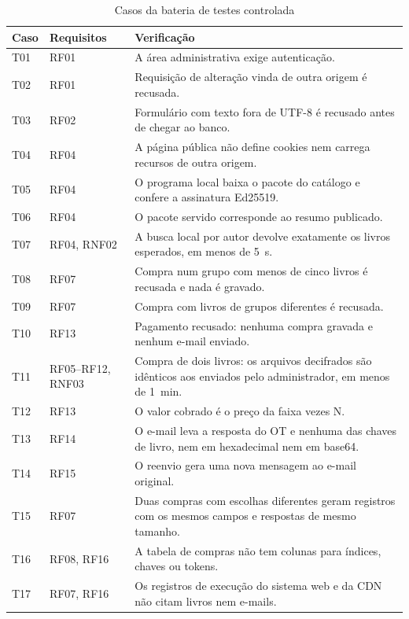 \begin{table}[H]
\centering
\caption{Casos da bateria de testes controlada}\label{tab:bateria}
\scriptsize
\renewcommand{\arraystretch}{1.12}
\begin{tabularx}{\textwidth}{@{}>{\raggedright\arraybackslash}p{}
  >{\raggedright\arraybackslash}p{} >{\raggedright\arraybackslash}X@{}}
\toprule
\textbf{Caso} & \textbf{Requisitos} & \textbf{Verificação} \\
\midrule
T01 & RF01 & A área administrativa exige autenticação. \\
T02 & RF01 & Requisição de alteração vinda de outra origem é recusada. \\
T03 & RF02 & Formulário com texto fora de UTF-8 é recusado antes de chegar ao banco. \\
T04 & RF04 & A página pública não define cookies nem carrega recursos de outra origem. \\
T05 & RF04 & O programa local baixa o pacote do catálogo e confere a assinatura Ed25519. \\
T06 & RF04 & O pacote servido corresponde ao resumo publicado. \\
T07 & RF04, RNF02 & A busca local por autor devolve exatamente os livros esperados, em menos de 5~s. \\
T08 & RF07 & Compra num grupo com menos de cinco livros é recusada e nada é gravado. \\
T09 & RF07 & Compra com livros de grupos diferentes é recusada. \\
T10 & RF13 & Pagamento recusado: nenhuma compra gravada e nenhum e-mail enviado. \\
T11 & RF05--RF12, RNF03 & Compra de dois livros: os arquivos decifrados são idênticos aos enviados pelo administrador, em menos de 1~min. \\
T12 & RF13 & O valor cobrado é o preço da faixa vezes N. \\
T13 & RF14 & O e-mail leva a resposta do OT e nenhuma das chaves de livro, nem em hexadecimal nem em base64. \\
T14 & RF15 & O reenvio gera uma nova mensagem ao e-mail original. \\
T15 & RF07 & Duas compras com escolhas diferentes geram registros com os mesmos campos e respostas de mesmo tamanho. \\
T16 & RF08, RF16 & A tabela de compras não tem colunas para índices, chaves ou tokens. \\
T17 & RF07, RF16 & Os registros de execução do sistema web e da CDN não citam livros nem e-mails. \\

\end{tabularx}
\end{table}
